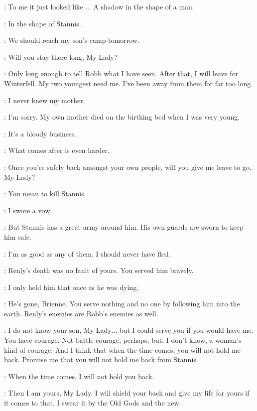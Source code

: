 \CATELYN: To me it just looked like $\ldots$ A shadow in the shape of a man. 

\BRIENNE: In the shape of Stannis. 

\CATELYN: We should reach my son's camp tomorrow. 

\BRIENNE: Will you stay there long, My Lady? 

\CATELYN: Only long enough to tell Robb what I have seen. After that, I will leave for Winterfell. My two youngest need me. I've been away from them for far too long. 

\BRIENNE: I never knew my mother. 

\CATELYN: I'm sorry. My own mother died on the birthing bed when I was very young. 

\BRIENNE: It's a bloody business. 

\CATELYN: What comes after is even harder. 

\BRIENNE: Once you're safely back amongst your own people, will you give me leave to go, My Lady? 

\CATELYN: You mean to kill Stannis. 

\BRIENNE: I swore a vow. 

\CATELYN: But Stannis has a great army around him. His own guards are sworn to keep him safe. 

\BRIENNE: I'm as good as any of them. I should never have fled. 

\CATELYN: Renly's death was no fault of yours. You served him bravely. 

\BRIENNE: I only held him that once as he was dying. 

\CATELYN: He's gone, Brienne. You serve nothing and no one by following him into the earth. Renly's enemies are Robb's enemies as well. 

\BRIENNE: I do not know your son, My Lady$\ldots$ but I could serve you if you would have me. You have courage. Not battle courage, perhaps, but, I don't know, a woman's kind of courage. And I think that when the time comes, you will not hold me back. Promise me that you will not hold me back from Stannis. 

\CATELYN: When the time comes, I will not hold you back. 


\BRIENNE: Then I am yours, My Lady. I will shield your back and give my life for yours if it comes to that. I swear it by the Old Gods and the new. 

